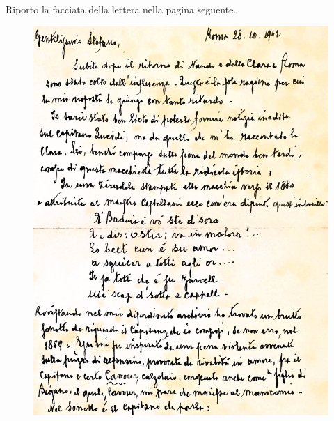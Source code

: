 \noindent Riporto la facciata della lettera nella pagina seguente.\\
 \begin{figure}[htb]
    \centering
    \includegraphics[width=\textwidth]{lettera}
\end{figure}

